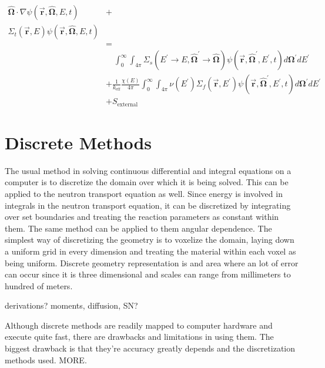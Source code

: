 \begin{equation}
\label{time_ind_NTE}
\begin{split}
\boldsymbol{\hat{\Omega}}  \cdot \nabla \psi(\boldsymbol{\vec{r}},\boldsymbol{\hat{\Omega}},E,t) &+ \\
\Sigma_t(\boldsymbol{\vec{r}},E) \psi(\boldsymbol{\vec{r}},\boldsymbol{\hat{\Omega}},E,t) & \\
& =  \\
& \quad \int_0^\infty  \int_{4\pi} \Sigma_s(E^\prime \rightarrow E,\boldsymbol{\hat{\Omega}}^\prime \rightarrow \boldsymbol{\hat{\Omega}}) \psi(\boldsymbol{\vec{r}},\boldsymbol{\hat{\Omega}}^\prime,E^\prime,t) d\boldsymbol{\Omega}^\prime dE^\prime  \\
&+ \frac{1}{k_{\mathrm{eff}}}\frac{\chi(E)}{4\pi} \int_0^\infty  \int_{4\pi}   \nu(E^\prime) \Sigma_f(\boldsymbol{\vec{r}},E^\prime) \psi(\boldsymbol{\vec{r}},\boldsymbol{\hat{\Omega}}^\prime,E^\prime,t) d\boldsymbol{\Omega}^\prime  dE^\prime\\
& + S_{\mathrm{external}}
\end{split}
 \end{equation}
 

\section{Discrete Methods}

The usual method in solving continuous differential and integral equations on a computer is to discretize the domain over which it is being solved.  This can be applied to the neutron transport equation as well.  Since energy is involved in integrals in the neutron transport equation, it can be discretized by integrating over set boundaries and treating the reaction parameters as constant within them.  The same method can be applied to them angular dependence.   The simplest way of discretizing the geometry is to voxelize the domain, laying down a uniform grid in every dimension and treating the material within each voxel as being uniform.  Discrete geometry representation is and area where an lot of error can occur since it is three dimensional and scales can range from millimeters to hundred of meters. 

derivations?  moments, diffusion, SN?

Although discrete methods are readily mapped to computer hardware and execute quite fast, there are drawbacks and limitations in using them.  The biggest drawback is that they're accuracy greatly depends and the discretization methods used.  MORE.

